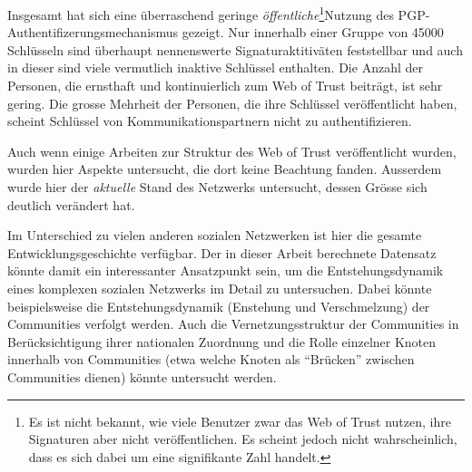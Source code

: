 Insgesamt hat sich eine \"uberraschend geringe
\emph{\"offentliche}\footnote{Es ist nicht bekannt, wie viele Benutzer
  zwar das Web of Trust nutzen, ihre Signaturen aber nicht
  ver\"offentlichen. Es scheint jedoch nicht wahrscheinlich, dass es
  sich dabei um eine signifikante Zahl handelt.}Nutzung des
PGP-Authentifizerungsmechanismus gezeigt. Nur innerhalb einer Gruppe
von 45000 Schl\"usseln sind \"uberhaupt nennenswerte
Signaturaktitiv\"aten feststellbar und auch in dieser sind viele
vermutlich inaktive Schl\"ussel enthalten. Die Anzahl der Personen,
die ernsthaft und kontinuierlich zum Web of Trust beitr\"agt, ist sehr
gering. Die grosse Mehrheit der Personen, die ihre Schl\"ussel
ver\"offentlicht haben, scheint Schl\"ussel von Kommunikationspartnern
nicht zu authentifizieren.

Auch wenn einige Arbeiten zur Struktur des Web of Trust
ver\"offentlicht wurden, wurden hier Aspekte untersucht, die dort
keine Beachtung fanden. Ausserdem wurde hier der \emph{aktuelle} Stand
des Netzwerks untersucht, dessen Gr\"osse sich deutlich ver\"andert
hat.

Im Unterschied zu vielen anderen sozialen Netzwerken ist hier die
gesamte Entwicklungsgeschichte verf\"ugbar. Der in dieser Arbeit
berechnete Datensatz k\"onnte damit ein interessanter Ansatzpunkt
sein, um die Entstehungsdynamik eines komplexen sozialen Netzwerks im
Detail zu untersuchen. Dabei k\"onnte beispielsweise die
Entstehungsdynamik (Enstehung und Verschmelzung) der Communities
verfolgt werden. Auch die Vernetzungsstruktur der Communities in
Ber\"ucksichtigung ihrer nationalen Zuordnung und die Rolle einzelner
Knoten innerhalb von Communities (etwa welche Knoten als ``Br\"ucken''
zwischen Communities dienen) k\"onnte untersucht
werden.

